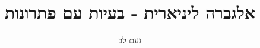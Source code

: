 \documentclass[english,hebrew]{article}
\begin{document}
\title{אלגברה ליניארית {\endL} - בעיות עם פתרונות}
\author{נעם לב}
\maketitle
\end{document}
